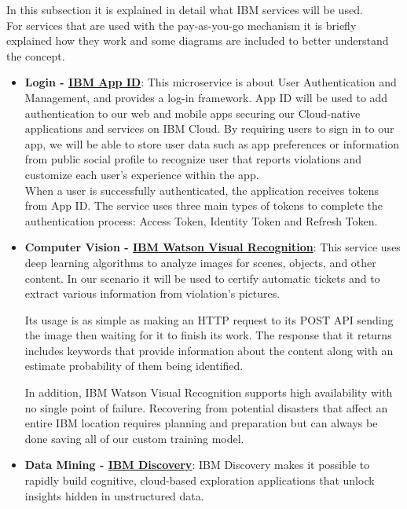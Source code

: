 In this subsection it is explained in detail what IBM services will be used. 
\\For services that are used with the pay-as-you-go mechanism it is briefly explained how they work and some diagrams are included to better understand the concept.
\begin{itemize}
	\item \textbf{Login - \href{https://cloud.ibm.com/catalog/services/app-id}{IBM App ID}}: \hypertarget{appid}{} This microservice is about User Authentication and Management, and provides a log-in framework. App ID will be used to add authentication to our web and mobile apps securing our Cloud-native applications and services on IBM Cloud. By requiring users to sign in to our app, we will be able to store user data such as app preferences or information from public social profile to recognize user that reports violations and customize each user's experience within the app.
	\\When a user is successfully authenticated, the application receives tokens from App ID. The service uses three main types of tokens to complete the authentication process: Access Token, Identity Token and Refresh Token.

	\item \textbf{Computer Vision - \href{https://cloud.ibm.com/catalog/services/visual-recognition}{IBM Watson Visual Recognition}}: \hypertarget{watson}{} This service uses deep learning algorithms to analyze images for scenes, objects, and other content. In our scenario it will be used to certify automatic tickets and to extract various information from violation's pictures.
	
	Its usage is as simple as making an HTTP request to its POST API sending the image then waiting for it to finish its work. The response that it returns includes keywords that provide information about the content along with an estimate probability of them being identified.
	
	In addition, IBM Watson Visual Recognition supports high availability with no single point of failure. Recovering from potential disasters that affect an entire IBM location requires planning and preparation but can always be done saving all of our custom training model.
	
	\item \textbf{Data Mining - \href{https://cloud.ibm.com/catalog/services/discovery}{IBM Discovery}}: \hypertarget{discovery}{} IBM Discovery makes it possible to rapidly build cognitive, cloud-based exploration applications that unlock insights hidden in unstructured data. 
	

\end{itemize}
